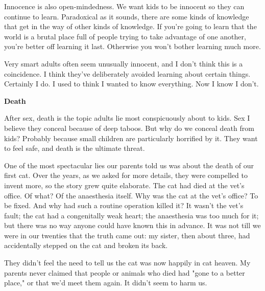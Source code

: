 Innocence is also
                  open-mindedness. We want kids to be innocent so they can
                  continue to learn. Paradoxical as it sounds, there are some
                  kinds of knowledge that get in the way of other kinds of
                  knowledge. If you're going to learn that the world is a brutal
                  place full of people trying to take advantage of one another,
                  you're better off learning it last. Otherwise you won't bother
                  learning much more.

Very smart adults often seem
                  unusually innocent, and I don't think this is a coincidence. I
                  think they've deliberately avoided learning about certain
                  things. Certainly I do. I used to think I wanted to know
                  everything. Now I know I don't.


                  \textbf{Death}

After sex, death is the topic adults
                  lie most conspicuously about to kids. Sex I believe they
                  conceal because of deep taboos. But why do we conceal death
                  from kids? Probably because small children are particularly
                  horrified by it. They want to feel safe, and death is the
                  ultimate threat.

One of the most spectacular lies
                  our parents told us was about the death of our first cat. Over
                  the years, as we asked for more details, they were compelled
                  to invent more, so the story grew quite elaborate. The cat had
                  died at the vet's office. Of what? Of the anaesthesia itself.
                  Why was the cat at the vet's office? To be fixed. And why had
                  such a routine operation killed it? It wasn't the vet's fault;
                  the cat had a congenitally weak heart; the anaesthesia was too
                  much for it; but there was no way anyone could have known this
                  in advance. It was not till we were in our twenties that the
                  truth came out: my sister, then about three, had accidentally
                  stepped on the cat and broken its back.

They didn't
                  feel the need to tell us the cat was now happily in cat
                  heaven. My parents never claimed that people or animals who
                  died had "gone to a better place," or that we'd meet them
                  again. It didn't seem to harm us.

